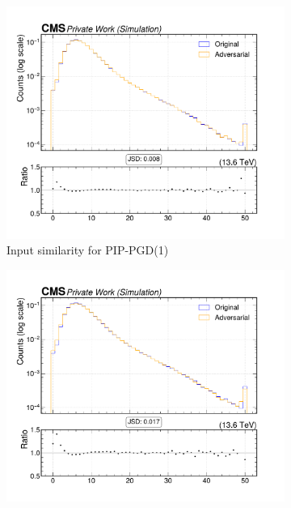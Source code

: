 \begin{figure}[htbp]
  \centering
  \begin{subfigure}[t]{0.32\textwidth}
    \includegraphics[width=\linewidth]{media/output/features/compare/combined_it_1/cmp_global_features_n_Cpfcand.pdf}
    \caption*{Input similarity for PIP-PGD(1)}
  \end{subfigure}\hfill
  \begin{subfigure}[t]{0.32\textwidth}
    \includegraphics[width=\linewidth]{media/output/features/compare/combined_it_2/cmp_global_features_n_Cpfcand.pdf}

\end{subfigure}
\end{figure}
